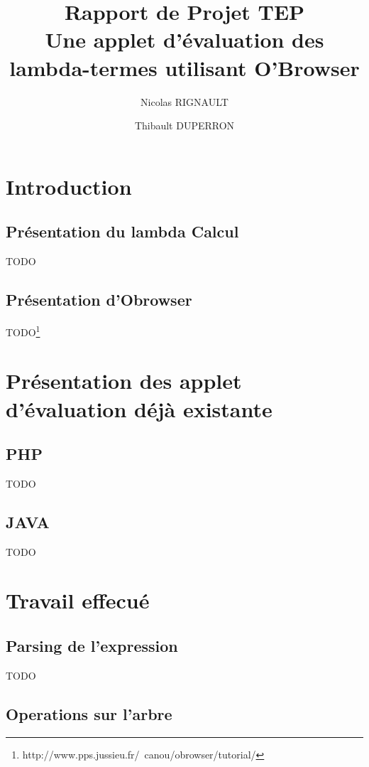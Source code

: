 \documentclass[a4paper,11pt,titlepage]{article}
\title{Rapport de Projet TEP\\Une applet d'évaluation des lambda-termes utilisant O'Browser}
\author{Nicolas RIGNAULT \and Thibault DUPERRON}
\begin{document}
\renewcommand{\bibname}{}
\renewcommand{\refname}{}
\maketitle
\tableofcontents

\newpage
\section{Introduction}

\subsection{Présentation du lambda Calcul}

TODO

\subsection{Présentation d'Obrowser}

TODO\footnote{http://www.pps.jussieu.fr/~canou/obrowser/tutorial/}
\newpage

\section{Présentation des applet d'évaluation déjà existante}

\subsection{PHP}

TODO

\subsection{JAVA}

TODO

\newpage
\section{Travail effecué}

\subsection{Parsing de l'expression}

TODO

\subsection{Operations sur l'arbre}
\end{document}
